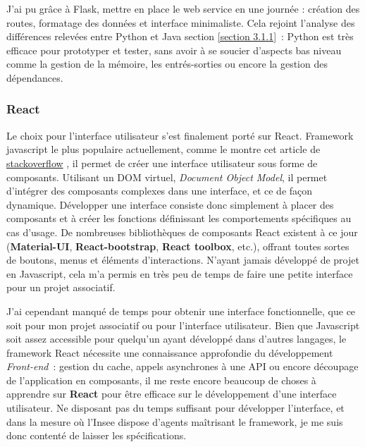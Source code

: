 J'ai pu grâce à Flask, mettre en place le web service en une journée : création des routes, formatage des données et interface minimaliste. Cela rejoint l'analyse des différences relevées entre Python et Java section \ref{section 3.1.1}~: Python est très efficace pour prototyper et tester, sans avoir à se soucier d'aspects bas niveau comme la gestion de la mémoire, les entrés-sorties ou encore la gestion des dépendances.
\label{section 3.2.2 - Flask}

\subsubsection*{React}
Le choix pour l'interface utilisateur s'est finalement porté sur React. Framework javascript le plus populaire actuellement, comme le montre cet article de \href{https://stackoverflow.blog/2018/01/11/brutal-lifecycle-javascript-frameworks/}{stackoverflow} \cite{stackoverflow-javascript}, il permet de créer une interface utilisateur sous forme de composants. Utilisant un DOM virtuel, \textit{Document Object Model}, il permet d'intégrer des composants complexes dans une interface, et ce de façon dynamique. Développer une interface consiste donc simplement à placer des composants et à créer les fonctions définissant les comportements spécifiques au cas d'usage. De nombreuses bibliothèques de composants React existent à ce jour (\textbf{Material-UI}, \textbf{React-bootstrap}, \textbf{React toolbox}, etc.), offrant toutes sortes de boutons, menus et éléments d'interactions. N'ayant jamais développé de projet en Javascript, cela m'a permis en très peu de temps de faire une petite interface pour un projet associatif.
\newline

J'ai cependant manqué de temps pour obtenir une interface fonctionnelle, que ce soit pour mon projet associatif ou pour l'interface utilisateur. Bien que Javascript soit assez accessible pour quelqu'un ayant développé dans d'autres langages, le framework React nécessite une connaissance approfondie du développement \textit{Front-end}~: gestion du cache, appels asynchrones à une API ou encore découpage de l'application en composants, il me reste encore beaucoup de choses à apprendre sur \textbf{React} pour être efficace sur le développement d'une interface utilisateur. Ne disposant pas du temps suffisant pour développer l'interface, et dans la mesure où l'Insee dispose d'agents maîtrisant le framework, je me suis donc contenté de laisser les spécifications.
\newline

